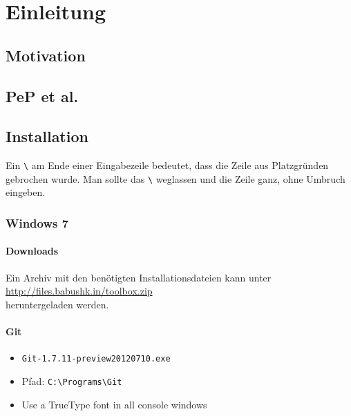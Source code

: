 \chapter{Einleitung}
\section{Motivation}
\section{PeP et al.}

\section{Installation}
Ein \verb|\| am Ende einer Eingabezeile bedeutet, dass die Zeile aus Platzgründen gebrochen wurde. Man sollte das \verb|\| weglassen und die Zeile ganz, ohne Umbruch eingeben.
\subsection{Windows 7}
\subsubsection{Downloads}
  Ein Archiv mit den benötigten Installationsdateien kann unter \\
  \url{http://files.babushk.in/toolbox.zip} \\
  heruntergeladen werden.

\subsubsection{Git}
\begin{itemize}
  \item \texttt{Git-1.7.11-preview20120710.exe}
  \item Pfad: \verb|C:\Programs\Git|
  \item Use a TrueType font in all console windows
\end{itemize}

